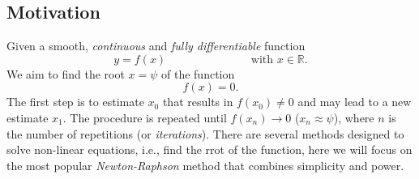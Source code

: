 \subsection{Motivation}
Given a smooth, {\it continuous} and {\it fully differentiable} function 
  \begin{displaymath}
     y = f(x) \hspace{3cm} \text{ with } x\in\mathbb{R}.
  \end{displaymath}
We aim to find the root $x=\psi$ of the function 
  \begin{displaymath}
     f(x) = 0.
  \end{displaymath}
The first step is to estimate $x_{0}$ that results in $f\left(x_{0}\right)\neq 0$ and may lead to a new estimate $x_{1}$. The procedure is repeated until $f\left(x_{n}\right)\rightarrow 0$ (\ie $x_{n}\approx\psi$), where $n$ is the number of repetitions (or {\it iterations}). There are several methods designed to solve non-linear equations, i.e., find the rrot of the function, here we will focus on the most popular {\it Newton-Raphson} method that combines simplicity and power.


